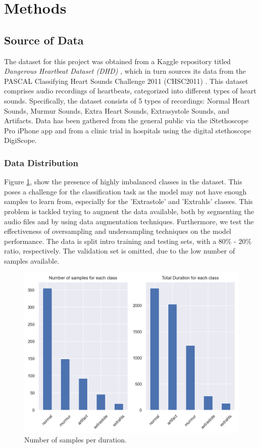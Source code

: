 \documentclass[twocolumn]{class}
\begin{document}
\section{Methods}
\subsection{Source of Data}
The dataset for this project was obtained from a Kaggle repository titled \textit{Dangerous Heartbeat Dataset (DHD)} \cite{Dangerous-Heartbeat-Dataset-DHD}, 
which in turn sources its data from the PASCAL Classifying Heart Sounds Challenge 2011 (CHSC2011) \cite{pascal-chsc-2011}. 
This dataset comprises audio recordings of heartbeats, categorized into different types of heart sounds.
Specifically, the dataset consists of 5 types of recordings: Normal Heart Sounds, Murmur Sounds, Extra Heart Sounds, Extrasystole Sounds, and Artifacts.
Data has been gathered from the general public via the iStethoscope Pro iPhone app and from a clinic trial in hospitals using the digital stethoscope DigiScope.

\subsubsection{Data Distribution}
Figure \ref{fig:DataExp_num_durations}, show the presence of highly imbalanced classes in the dataset.
This poses a challenge for the classification task as the model may not have enough samples to learn from,
especially for the 'Extrastole' and 'Extrahls' classes. This problem is tackled trying to augment the data available,
both by segmenting the audio files and by using data augmentation techniques. Furthermore, 
we test the effectiveness of oversampling and undersampling techniques on the model performance.
The data is split intro training and testing sets, with a 80\% - 20\% ratio, respectively. The validation set
is omitted, due to the low number of samples available.

\begin{figure}[H]
    \centering
    \includegraphics[width=1\columnwidth]{./images/DataExp_num_durations.png}
    \caption{Number of samples per duration.}
    \label{fig:DataExp_num_durations}
\end{figure}
\end{document}
